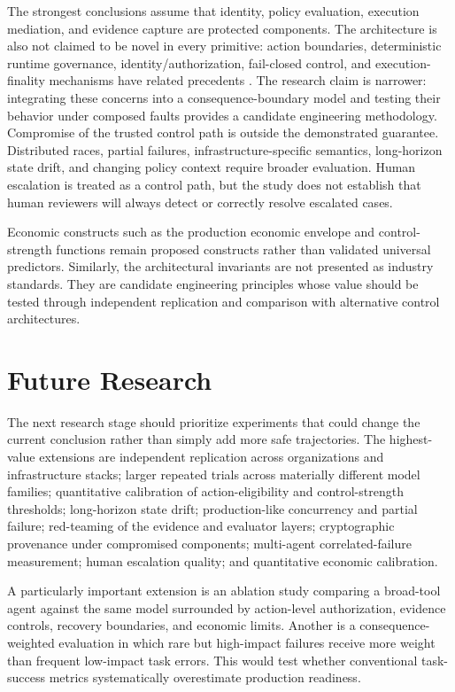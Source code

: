 \documentclass[conference]{IEEEtran}
\begin{document}
The strongest conclusions assume that identity, policy evaluation, execution mediation, and evidence capture are protected components. The architecture is also not claimed to be novel in every primitive: action boundaries, deterministic runtime governance, identity/authorization, fail-closed control, and execution-finality mechanisms have related precedents \cite{r4,r5,r8,r15,r16,r17,r18}. The research claim is narrower: integrating these concerns into a consequence-boundary model and testing their behavior under composed faults provides a candidate engineering methodology. Compromise of the trusted control path is outside the demonstrated guarantee. Distributed races, partial failures, infrastructure-specific semantics, long-horizon state drift, and changing policy context require broader evaluation. Human escalation is treated as a control path, but the study does not establish that human reviewers will always detect or correctly resolve escalated cases.

Economic constructs such as the production economic envelope and control-strength functions remain proposed constructs rather than validated universal predictors. Similarly, the architectural invariants are not presented as industry standards. They are candidate engineering principles whose value should be tested through independent replication and comparison with alternative control architectures.

\section{Future Research}
The next research stage should prioritize experiments that could change the current conclusion rather than simply add more safe trajectories. The highest-value extensions are independent replication across organizations and infrastructure stacks; larger repeated trials across materially different model families; quantitative calibration of action-eligibility and control-strength thresholds; long-horizon state drift; production-like concurrency and partial failure; red-teaming of the evidence and evaluator layers; cryptographic provenance under compromised components; multi-agent correlated-failure measurement; human escalation quality; and quantitative economic calibration.

A particularly important extension is an ablation study comparing a broad-tool agent against the same model surrounded by action-level authorization, evidence controls, recovery boundaries, and economic limits. Another is a consequence-weighted evaluation in which rare but high-impact failures receive more weight than frequent low-impact task errors. This would test whether conventional task-success metrics systematically overestimate production readiness.
\end{document}
